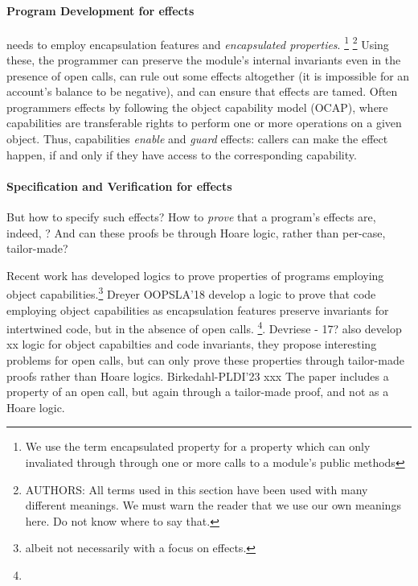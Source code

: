 \paragraph{Program Development for \tamed effects} %
needs to employ 
 encapsulation features and \emph{encapsulated properties}.
 \footnote{We use the term encapsulated property for a property which can only invaliated through through one or more calls to a module's public methods}
\footnote{AUTHORS: All terms used in this section have been used with many different meanings. 
We must warn the reader that we use our own meanings here. 
Do not know where to say that.}
Using these, the programmer can preserve the module's internal invariants  even in the presence of open calls,
can rule out some effects altogether (\eg it is impossible for an account's balance to be negative), and
can ensure that effects are tamed.
 Often  programmers  \tame  effects by  following the object capability model (OCAP)\cite{Miller}, where  
 capabilities are transferable rights to perform one or more operations on a given object.
Thus, capabilities \emph{enable} and  \emph{guard} effects:   
callers can make the effect   happen, if and only if they have access to the corresponding capability.
 
 
\paragraph{Specification and Verification  for \tamed effects} But how to specify such \tamed effects? How to \emph{prove} that a program's effects are, indeed, \tamed?
And can these proofs be  through Hoare logic, rather than   per-case, tailor-made?
 
Recent work has developed logics to prove properties of programs employing object capabilities.\footnote{albeit not necessarily with a focus on \tamed effects.}
Dreyer OOPSLA'18 develop a logic to prove that   code employing object capabilities as encapsulation features preserve invariants for intertwined code, but in the absence of open calls. 
 \footnote{}.
Devriese - 17? also develop xx logic for object capabilties and code invariants, they propose interesting problems for open calls, 
but can only prove these properties through tailor-made proofs rather than Hoare logics.
Birkedahl-PLDI'23 xxx The paper includes a property of an open call, but again through a tailor-made proof, and not as a Hoare logic.


